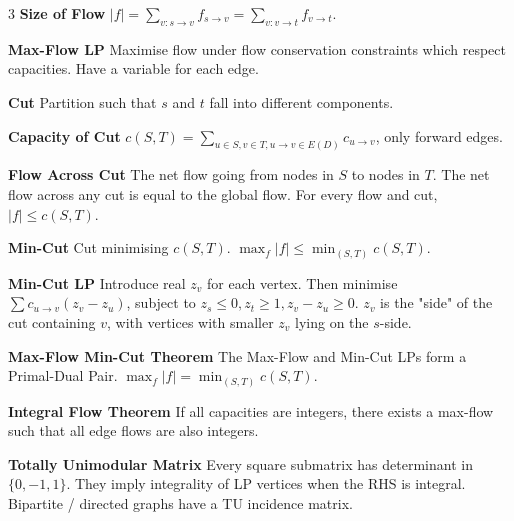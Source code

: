 \documentclass[10pt, landscape]{article}
\begin{document}
\begin{multicols*}{3}
\textbf{Size of Flow} $|f|=\sum_{v: s\rightarrow v}f_{s\rightarrow v}=\sum_{v: v\rightarrow 
t}f_{v\rightarrow t}$.

\textbf{Max-Flow LP} Maximise flow under flow conservation constraints which respect capacities. Have a variable for each edge.


\textbf{Cut} Partition such that $s$ and $t$ fall into different components.

\textbf{Capacity of Cut} $c(S, T)=\sum_{u \in S, v \in T, u \rightarrow v \in E(D)}c_{u \rightarrow v}$, only forward edges.

\textbf{Flow Across Cut} The net flow going from nodes in $S$ to nodes in $T$. The net flow across any cut is equal to the global flow. For every flow and cut, $|f| \leq c(S, T)$.


\textbf{Min-Cut} Cut minimising $c(S, T)$. $\max_f|f| \leq \min_{(S,T)}c(S, T)$.

\textbf{Min-Cut LP} Introduce real $z_v$ for each vertex. Then minimise $\sum c_{u \rightarrow v}(z_v-z_u)$, subject to $z_s \leq 0, z_t \geq 1, z_v-z_u \geq 0$. $z_v$ is the "side" of the cut containing $v$, with vertices with smaller $z_v$ lying on the $s$-side.

\textbf{Max-Flow Min-Cut Theorem} The Max-Flow and Min-Cut LPs form a Primal-Dual Pair. $\max_f|f|=\min_{(S, T)}c(S, T)$.

\textbf{Integral Flow Theorem} If all capacities are integers, there exists a max-flow such that all edge flows are also integers.

\textbf{Totally Unimodular Matrix} Every square submatrix has determinant in $\{0,-1,1\}$. They imply integrality of LP vertices when the RHS is integral. Bipartite / directed graphs have a TU incidence matrix.


\end{multicols*}
\end{document}
